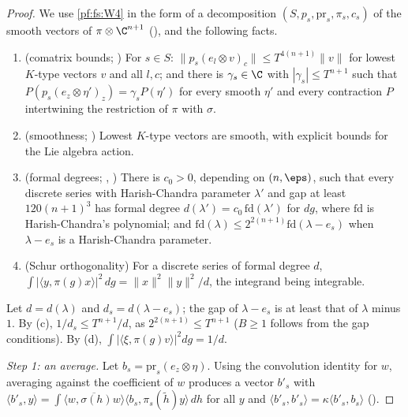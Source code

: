 \begin{proof}
We use \ref{pf:fs:W4} in the form of a decomposition $(S,p_s,\mathrm{pr}_s,\pi_s,c_s)$ of the smooth vectors of $\pi\otimes\C^{n+1}$
(), and the following facts.
\begin{enumerate}[label=(\alph*)]
\item (comatrix bounds; ) For $s\in S$: $\|p_s(e_l\otimes v)_c\|\le T^{4(n+1)}\|v\|$
for lowest $K$-type vectors $v$ and all $l,c$; and there is $\gamma_s\in\C$ with $|\gamma_s|\le T^{n+1}$ such that
$P(p_s(e_z\otimes\eta')_z)=\gamma_sP(\eta')$ for every smooth $\eta'$ and every contraction $P$ intertwining the restriction of $\pi$ with $\sigma$.
\item (smoothness; ) Lowest $K$-type vectors are smooth, with explicit bounds for
the Lie algebra action.
\item (formal degrees; , ) There is
$c_0>0$, depending on $(n,\eps)$, such that every discrete series with Harish-Chandra parameter $\lambda'$ and gap at least $120(n+1)^3$ has formal
degree $d(\lambda')=c_0\,\mathrm{fd}(\lambda')$ for $dg$, where $\mathrm{fd}$ is Harish-Chandra's polynomial; and
$\mathrm{fd}(\lambda)\le2^{2(n+1)}\mathrm{fd}(\lambda-e_s)$ when $\lambda-e_s$ is a Harish-Chandra parameter.
\item (Schur orthogonality) For a discrete series of formal degree $d$, $\int|\langle y,\pi(g)x\rangle|^2\,dg=\|x\|^2\|y\|^2/d$, the integrand
being integrable.
\end{enumerate}
Let $d=d(\lambda)$ and $d_s=d(\lambda-e_s)$; the gap of $\lambda-e_s$ is at least that of $\lambda$ minus $1$. By (c), $1/d_s\le T^{n+1}/d$, as
$2^{2(n+1)}\le T^{n+1}$ ($B\ge1$ follows from the gap conditions). By (d), $\int|\langle\xi,\pi(g)v\rangle|^2dg=1/d$.

\emph{Step 1: an average.} Let $b_s=\mathrm{pr}_s(e_z\otimes\eta)$. Using the convolution identity for $w$, averaging against the coefficient of $w$
produces a vector $b'_s$ with $\langle b'_s,y\rangle=\int\overline{\langle w,\sigma(h)w\rangle}\langle b_s,\pi_s(\tilde h)y\rangle\,dh$ for all $y$ and
$\langle b'_s,b'_s\rangle=\kappa\langle b'_s,b_s\rangle$ ().


\end{proof}
